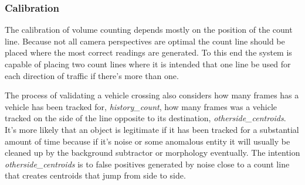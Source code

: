 


\subsubsection{Calibration}

The calibration of volume counting depends mostly on the position of the count line. Because not all camera perspectives are optimal the count line should be placed where the most correct readings are generated. To this end the system is capable of placing two count lines where it is intended that one line be used for each direction of traffic if there's more than one. 

The process of validating a vehicle crossing also considers how many frames has a vehicle has been tracked for, \emph{history\_count}, how many frames was a vehicle tracked on the side of the line opposite to its destination, \emph{otherside\_centroids}.  It's more likely that an object is legitimate if it has been tracked for a substantial amount of time because if it's noise or some anomalous entity it will usually be cleaned up by the background subtractor or morphology eventually. The intention \emph{otherside\_centroids} is to false positives generated by noise close to a count line that creates centroids that jump from side to side.
  